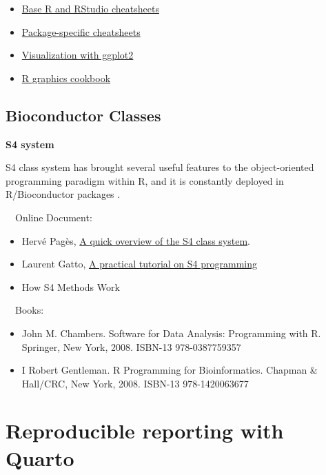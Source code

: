 \documentclass[
]{book}
\providecommand{\tightlist}{%
  \setlength{\itemsep}{0pt}\setlength{\parskip}{0pt}}
\begin{document}
\begin{itemize}
\tightlist
\item
  \href{https://geomoer.github.io/moer-base-r/cheatsheet.html}{Base R and RStudio cheatsheets}
\item
  \href{https://www.rstudio.com/resources/cheatsheets/}{Package-specific cheatsheets}
\item
  \href{https://ggplot2.tidyverse.org/}{Visualization with ggplot2}
\item
  \href{http://www.cookbook-r.com/Graphs/}{R graphics cookbook}
\end{itemize}

\hypertarget{bioc_intro}{%
\subsection{Bioconductor Classes}\label{bioc_intro}}

\textbf{S4 system}

S4 class system has brought several useful features to the
object-oriented programming paradigm within R, and it is constantly
deployed in R/Bioconductor packages \citep{Huber2015}.

~~Online Document:

\begin{itemize}
\tightlist
\item
  Hervé Pagès, \href{https://bioconductor.org/packages/release/bioc/vignettes/S4Vectors/inst/doc/S4QuickOverview.pdf}{A quick overview of the S4 class system}.
\item
  Laurent Gatto, \href{https://bioconductor.org/help/course-materials/2013/CSAMA2013/friday/afternoon/S4-tutorial.pdf}{A practical tutorial on S4 programming}
\item
  How S4 Methods Work \citep{Chambers2006}
\end{itemize}

~~Books:

\begin{itemize}
\tightlist
\item
  John M. Chambers. Software for Data Analysis: Programming with R. Springer, New York, 2008. ISBN-13 978-0387759357 \citep{Chambers2008}
\item
  I Robert Gentleman. R Programming for Bioinformatics. Chapman \& Hall/CRC, New York, 2008. ISBN-13 978-1420063677 \citep{gentleman2008r}
\end{itemize}

\hypertarget{quarto}{%
\section{Reproducible reporting with Quarto}\label{quarto}}
\end{document}
